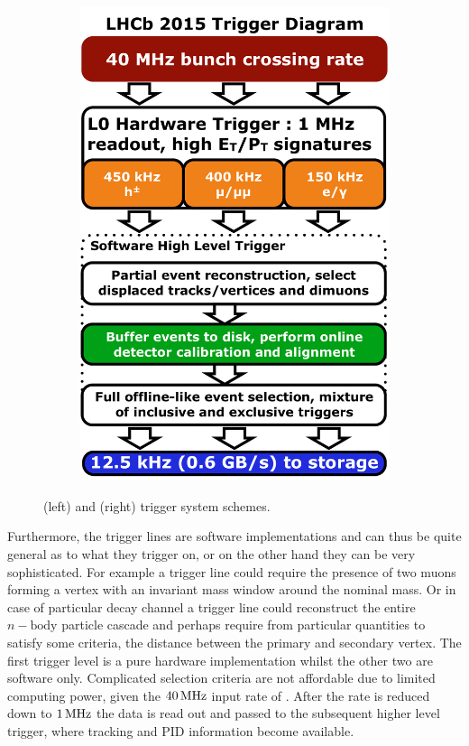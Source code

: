 \begin{figure}[t]
\begin{subfigure}{0.5\textwidth}
    \includegraphics[width=\textwidth]{Figures/Chapter2/LHCb_Trigger_RunII_May2015}
    \caption{}
    \label{det_run_two_trigger}
  \end{subfigure}
  \caption{ \runone (left) and \runtwo (right) trigger system schemes.}
  \label{det_trigger_scheams}
\end{figure}


Furthermore, the \hlt trigger lines are software
implementations and can thus be quite general as to what they trigger on, or on the other hand they can
be very sophisticated. For example a trigger line could require the presence of two muons forming a vertex
with an invariant mass window around the nominal \jpsi mass. Or in case of particular decay channel a
trigger line could reconstruct the entire $n-\text{body}$ particle cascade and perhaps require from
particular quantities to satisfy some criteria, \ie the distance between the primary and secondary vertex.
The first trigger level is a pure hardware implementation whilst the other two are software only.
Complicated selection criteria are not affordable due to limited computing power, given the
$40{\rm \,MHz}$ input rate of \lzero. After the rate is reduced down to $1{\rm \,MHz}$ the data is read out and
passed to the subsequent higher level trigger, where tracking and PID information become available.

